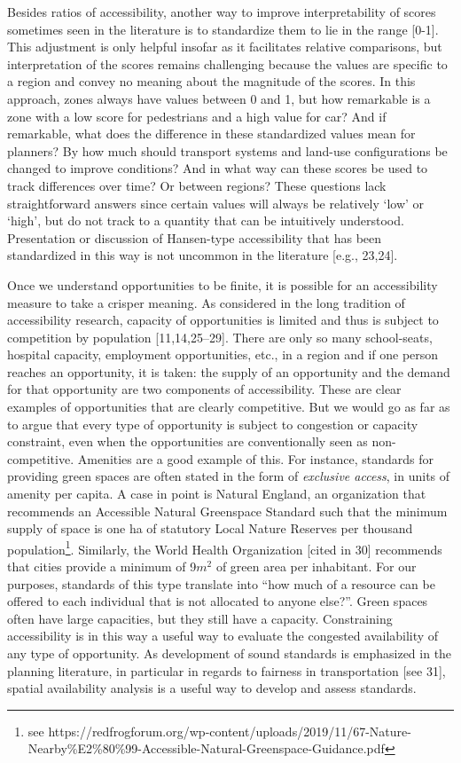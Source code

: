 \documentclass[10pt,letterpaper]{article}
\begin{document}
Besides ratios of accessibility, another way to improve interpretability
of scores sometimes seen in the literature is to standardize them to lie
in the range {[}0-1{]}. This adjustment is only helpful insofar as it
facilitates relative comparisons, but interpretation of the scores
remains challenging because the values are specific to a region and
convey no meaning about the magnitude of the scores. In this approach,
zones always have values between 0 and 1, but how remarkable is a zone
with a low score for pedestrians and a high value for car? And if
remarkable, what does the difference in these standardized values mean
for planners? By how much should transport systems and land-use
configurations be changed to improve conditions? And in what way can
these scores be used to track differences over time? Or between regions?
These questions lack straightforward answers since certain values will
always be relatively `low' or `high', but do not track to a quantity
that can be intuitively understood. Presentation or discussion of
Hansen-type accessibility that has been standardized in this way is not
uncommon in the literature {[}e.g., 23,24{]}.

Once we understand opportunities to be finite, it is possible for an
accessibility measure to take a crisper meaning. As considered in the
long tradition of accessibility research, capacity of opportunities is
limited and thus is subject to competition by population
{[}11,14,25--29{]}. There are only so many school-seats, hospital
capacity, employment opportunities, etc., in a region and if one person
reaches an opportunity, it is taken: the supply of an opportunity and
the demand for that opportunity are two components of accessibility.
These are clear examples of opportunities that are clearly competitive.
But we would go as far as to argue that every type of opportunity is
subject to congestion or capacity constraint, even when the
opportunities are conventionally seen as non-competitive. Amenities are
a good example of this. For instance, standards for providing green
spaces are often stated in the form of \emph{exclusive access}, in units
of amenity per capita. A case in point is Natural England, an
organization that recommends an Accessible Natural Greenspace Standard
such that the minimum supply of space is one ha of statutory Local
Nature Reserves per thousand population\footnote{see
  https://redfrogforum.org/wp-content/uploads/2019/11/67-Nature-Nearby\%E2\%80\%99-Accessible-Natural-Greenspace-Guidance.pdf}.
Similarly, the World Health Organization {[}cited in 30{]} recommends
that cities provide a minimum of 9\(m^2\) of green area per inhabitant.
For our purposes, standards of this type translate into ``how much of a
resource can be offered to each individual that is not allocated to
anyone else?''. Green spaces often have large capacities, but they still
have a capacity. Constraining accessibility is in this way a useful way
to evaluate the congested availability of any type of opportunity. As
development of sound standards is emphasized in the planning literature,
in particular in regards to fairness in transportation {[}see 31{]},
spatial availability analysis is a useful way to develop and assess
standards.
\end{document}
